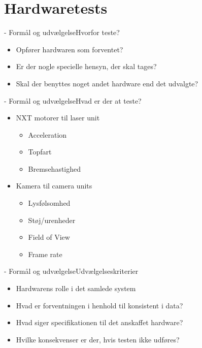 \section{Hardwaretests}
\begin{frame}[fragile]{\insertsection - Formål og udvælgelse}{Hvorfor teste?}
 \begin{itemize}
     \item Opfører hardwaren som forventet?
     \item Er der nogle specielle hensyn, der skal tages?
     \item Skal der benyttes noget andet hardware end det udvalgte?
  \end{itemize}
\end{frame}

\begin{frame}[fragile]{\insertsection - Formål og udvælgelse}{Hvad er der at teste?}
  \begin{itemize}
      \item NXT motorer til laser unit
      \begin{itemize}
          \item Acceleration
          \item Topfart
          \item Bremsehastighed
      \end{itemize}
      \item Kamera til camera units
      \begin{itemize}
          \item Lysfølsomhed
          \item Støj/urenheder
          \item Field of View
          \item Frame rate
      \end{itemize}
  \end{itemize}
\end{frame}

\begin{frame}[fragile]{\insertsection - Formål og udvælgelse}{Udvælgelseskriterier}
 \begin{itemize}
  \item Hardwarens rolle i det samlede system
  \item Hvad er forventningen i henhold til konsistent i data?
  \item Hvad siger specifikationen til det anskaffet hardware?
  \item Hvilke konsekvenser er der, hvis testen ikke udføres?
 \end{itemize}
\end{frame}

